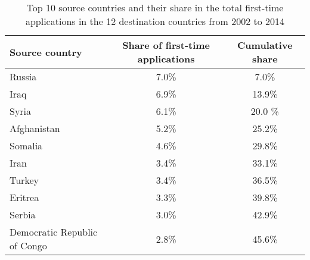 
\begin{table}[htbp]\centering
\caption{Top 10 source countries and their share in the total first-time applications in the 12 destination countries from 2002 to 2014}
\begin{tabular}{l c c}
\hline \hline
\textbf{Source country} & \textbf{ Share of first-time applications}  & \textbf{Cumulative share} \\
\hline \hline
\smallskip
Russia &  7.0\% & 7.0\% \\
\smallskip
Iraq & 6.9\%  & 13.9\% \\
\smallskip
Syria & 6.1\%  & 20.0 \%  \\
\smallskip
Afghanistan & 5.2\% & 25.2\% \\
\smallskip
Somalia & 4.6\% & 29.8\%  \\
\smallskip
Iran & 3.4\% & 33.1\%  \\
\smallskip
Turkey  & 3.4\% & 36.5\% \\
\smallskip 
Eritrea & 3.3\% & 39.8\% \\
\smallskip
Serbia & 3.0\% & 42.9\% \\
\smallskip
Democratic Republic of Congo  & 2.8\% & 45.6\% \\
\hline \hline
\end{tabular}
\label{origin_countries}
\end{table}